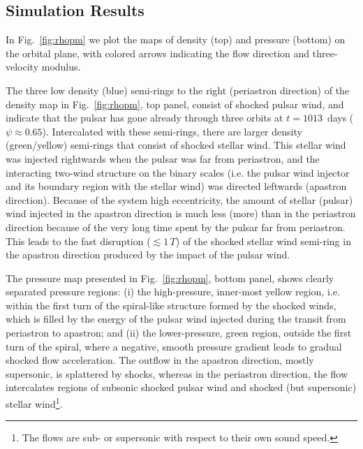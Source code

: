 \documentclass[usenatbib]{mn2e}
\begin{document}
\subsection{Simulation Results}

In Fig.~\ref{fig:rhopm} we plot the maps of density (top) and pressure (bottom) on the orbital plane, with colored arrows indicating the flow direction and three-velocity modulus. 

The three low density (blue) semi-rings to the right (periastron direction) of the density map in
Fig.~\ref{fig:rhopm}, top panel, consist of shocked pulsar wind, and indicate that the pulsar has gone already through three orbits at $t=1013$~days ($\psi\approx 0.65$). Intercalated with these semi-rings, 
there are larger density (green/yellow) semi-rings that consist of shocked stellar wind. This stellar wind was injected rightwards when the pulsar was far from periastron, and the interacting two-wind structure on the binary scales (i.e. the pulsar wind injector and its boundary region with the stellar wind) was directed leftwards (apastron direction). Because of the system high eccentricity, the amount of stellar (pulsar) wind injected in the apastron direction is much less (more) than in the periastron direction because of the very long time spent by the pulsar far from periastron. This leads to the fast disruption ($\lesssim 1\,T$) of the shocked stellar wind semi-ring in the apastron direction produced by the impact of the pulsar wind. 

The pressure map presented in Fig.~\ref{fig:rhopm}, bottom panel, shows clearly separated pressure regions: (i) the high-pressure, inner-most yellow region, i.e. within the first turn of the spiral-like structure formed by the shocked winds, which is filled by the energy of the pulsar wind injected during the transit from periastron to apastron; and (ii) the lower-pressure, green region, outside the first turn of the spiral, where a negative, smooth pressure gradient leads to
gradual shocked flow acceleration. The outflow in the apastron direction, mostly supersonic, is splattered by shocks, whereas in the periastron direction, the flow intercalates regions of subsonic shocked pulsar wind and shocked (but supersonic) stellar wind\footnote{The flows are sub- or supersonic with respect to their own sound speed.}. 
\end{document}

